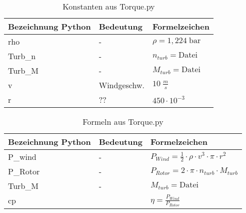 \newpage  

\begin{table}[h!]

\centering
\caption{Konstanten aus Torque.py}
\label{tab:cont_Torque}
\renewcommand{\arraystretch}{2}
\setlength{\tabcolsep}{7mm}

\begin{tabular}{lll}
    \toprule
     Bezeichnung Python & Bedeutung & Formelzeichen\\
    \midrule
    rho &-&$\rho   = 1,224\; \text{bar}$\\
    Turb\_n &-&$n_{turb} = \text{Datei}$\\
    Turb\_M &-&$M_{turb} = \text{Datei}$\\
    v &Windgeschw.&$10\; \frac{m}{s}$\\
    r&??&$450 \cdot 10^{-3}$\\
 

    \bottomrule
  \end{tabular}
\end{table}

\begin{table}[h!]

\centering
\caption{Formeln aus Torque.py}
\label{tab:parameter_Torque}
\renewcommand{\arraystretch}{2}
\setlength{\tabcolsep}{7mm}

\begin{tabular}{lll}
    \toprule
     Bezeichnung Python & Bedeutung & Formelzeichen\\
    \midrule
    P\_wind &-&$P_{Wind}   = \frac{1}{2}\cdot \rho  \cdot v^3 \cdot \pi \cdot r^2 $\\
    P\_Rotor &-&$P_{Rotor}   = 2 \cdot \pi \cdot n_ {turb} \cdot M_{turb}$\\
    Turb\_M &-&$M_{turb} = \text{Datei}$\\ 
    cp &&$\eta  = \frac{P_{Wind}}{P_{Rotor}}$\\
 

    \bottomrule
  \end{tabular}
\end{table} 
